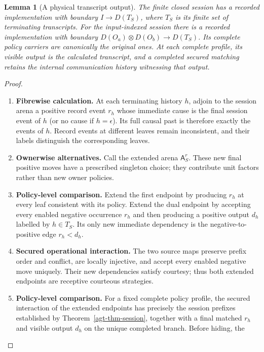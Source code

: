 \documentclass[11pt,a4paper]{article}
\numberwithin{equation}{section}
\newtheorem{lemma}[theorem]{Lemma}
\theoremstyle{definition}
\theoremstyle{remark}
\theoremstyle{plain}
\begin{document}
\begin{lemma}[A physical transcript output]
\label{agt-lem-session-recorder}
The finite closed session has a recorded implementation with boundary
$I\to D(T_S)$, where $T_S$ is its finite set of terminating transcripts.
For the input-indexed session there is a recorded implementation with
boundary $D(O_a)\otimes D(O_b)\to D(T_S)$.  Its complete policy carriers
are canonically the original ones.  At each complete profile, its visible
output is the calculated transcript, and a completed secured matching
retains the internal communication history witnessing that output.
\end{lemma}

\begin{proof}
\leavevmode
\begin{enumerate}[label=\textup{(\arabic*)},leftmargin=*,itemsep=4pt,topsep=3pt]
  \item \textbf{Fibrewise calculation.} At each terminating history $h$, adjoin to the session arena a positive
record event $r_h$ whose immediate cause is the final session event of
$h$ (or no cause if $h=\epsilon$). Its full causal past is therefore
exactly the events of $h$. Record events at different leaves remain
inconsistent, and their labels distinguish the corresponding leaves.
  \item \textbf{Ownerwise alternatives.} Call the extended arena $\mathsf A_S^r$. These new final positive moves
have a prescribed singleton choice; they contribute unit factors rather
than new owner policies.
  \item \textbf{Policy-level comparison.} Extend the first endpoint by producing $r_h$ at every leaf consistent
with its policy. Extend the dual endpoint by accepting every enabled
negative occurrence $r_h$ and then producing a positive output $d_h$
labelled by $h\in T_S$. Its only new immediate dependency is the
negative-to-positive edge $r_h<d_h$.
  \item \textbf{Secured operational interaction.} The two source maps preserve
prefix order and conflict, are locally injective, and accept every
enabled negative move uniquely. Their new dependencies satisfy courtesy;
thus both extended endpoints are receptive courteous strategies.
  \item \textbf{Policy-level comparison.} For a fixed complete policy profile, the secured interaction of the
extended endpoints has precisely the session prefixes established by
Theorem~\ref{agt-thm-session}, together with a final matched $r_h$ and
visible output $d_h$ on the unique completed branch. Before hiding, the

\end{enumerate}
\end{proof}
\end{document}
